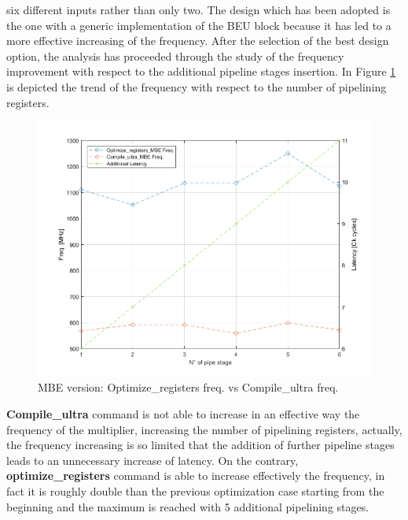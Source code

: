 \documentclass[a4paper, titlepage]{article}
\begin{document}
six different inputs rather than only two.
The design which has been adopted is the one with a generic implementation of the BEU block because it has led to a more effective increasing of the frequency. After the selection of the best design option, the analysis has proceeded through the study of the frequency improvement with respect to the additional pipeline stages insertion. 
In Figure \ref{fig:freq_MBE} is depicted the trend of the frequency with respect to the number of pipelining registers.


\begin{figure}[htp]
\centering
\includegraphics[scale=0.4]{freq_comp_MBE.png}
	\caption{MBE version: Optimize\_registers freq. vs Compile\_ultra freq.}
	\label{fig:freq_MBE}
\end{figure}
\noindent
\newline
\textbf{Compile\_ultra} command is not able to increase in an effective way the frequency of the multiplier, increasing the number of pipelining registers, actually, the frequency increasing is so limited that the addition of further pipeline stages leads to an unnecessary increase of latency.
\newline
On the contrary, \textbf{optimize\_registers} command is able to increase effectively the frequency, in fact it is roughly double than the previous optimization case starting from the beginning and the maximum is reached with 5 additional pipelining stages.
\end{document}
